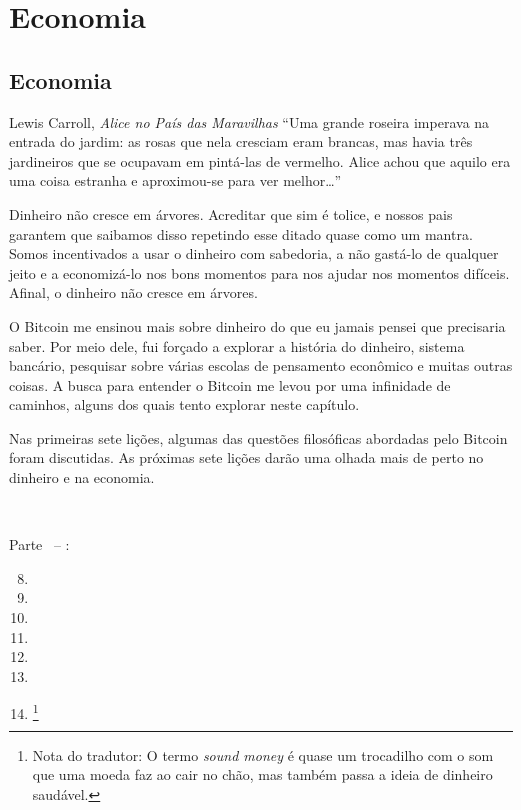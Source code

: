 \part{Economia}
\label{ch:economics}
\chapter*{Economia}

\begin{chapquote}{Lewis Carroll, \textit{Alice no País das Maravilhas}}
\enquote{Uma grande roseira imperava na entrada do jardim: as rosas que nela cresciam eram brancas, mas havia três jardineiros que se ocupavam em pintá-las de vermelho. Alice achou que aquilo era uma coisa estranha e aproximou-se para ver melhor\ldots}
\end{chapquote}

Dinheiro não cresce em árvores. Acreditar que sim é tolice, e nossos pais garantem que saibamos disso repetindo esse ditado quase como um mantra. Somos incentivados a usar o dinheiro com sabedoria, a não gastá-lo de qualquer jeito e a economizá-lo nos bons momentos para nos ajudar nos momentos difíceis. Afinal, o dinheiro não cresce em árvores.

O Bitcoin me ensinou mais sobre dinheiro do que eu jamais pensei que precisaria saber. Por meio dele, fui forçado a explorar a história do dinheiro, sistema bancário, pesquisar sobre várias escolas de pensamento econômico e muitas outras coisas. A busca para entender o Bitcoin me levou por uma infinidade de caminhos, alguns dos quais tento explorar neste capítulo.

Nas primeiras sete lições, algumas das questões filosóficas abordadas pelo Bitcoin foram discutidas. As próximas sete lições darão uma olhada mais de perto no dinheiro e na economia.

~

\begin{samepage}
Parte~\ref{ch:economics} -- :

\begin{enumerate}
  \setcounter{enumi}{7}
  \item {}
  \item {}
  \item {}
  \item {}
  \item {}
  \item {}
  \item {}\footnote{Nota do tradutor: O termo \textit{sound money} é quase um trocadilho com o som que uma moeda faz ao cair no chão, mas também passa a ideia de dinheiro saudável.}
\end{enumerate}
\end{samepage}

